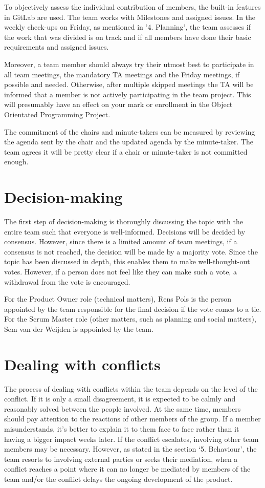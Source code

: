 \documentclass[sigconf,nonacm]{acmart}
\begin{document}
To objectively assess the individual contribution of members, the built-in features in GitLab are used. The team works with Milestones and assigned issues. In the weekly check-ups on Friday, as mentioned in '4. Planning', the team assesses if the work that was divided is on track and if all members have done their basic requirements and assigned issues.

Moreover, a team member should always try their utmost best to participate in all team meetings, the mandatory TA meetings and the Friday meetings, if possible and needed. Otherwise, after multiple skipped meetings the TA will be informed that a member is not actively participating in the team project. This will presumably have an effect on your mark or enrollment in the Object Orientated Programming Project.

The commitment of the chairs and minute-takers can be measured by reviewing the agenda sent by the chair and the updated agenda by the minute-taker. The team agrees it will be pretty clear if a chair or minute-taker is not committed enough. 


\section{Decision-making}
The first step of decision-making is thoroughly discussing the topic with the entire team such that everyone is well-informed. Decisions will be decided by consensus. However, since there is a limited amount of team meetings, if a consensus is not reached, the decision will be made by a majority vote. Since the topic has been discussed in depth, this enables them to make well-thought-out votes. However, if a person does not feel like they can make such a vote, a withdrawal from the vote is encouraged.

For the Product Owner role (technical matters), Rens Pols is the person appointed by the team responsible for the final decision if the vote comes to a tie.
For the Scrum Master role (other matters, such as planning and social matters), Sem van der Weijden is appointed by the team.


\section{Dealing with conflicts}
The process of dealing with conflicts within the team depends on the level of the conflict. If it is only a small disagreement, it is expected to be calmly and reasonably solved between the people involved. At the same time, members should pay attention to the reactions of other members of the group. If a member misunderstands, it's better to explain it to them face to face rather than it having a bigger impact weeks later. If the conflict escalates, involving other team members may be necessary. However, as stated in the section ‘5. Behaviour’, the team resorts to involving external parties or seeks their mediation, when a conflict reaches a point where it can no longer be mediated by members of the team and/or the conflict delays the ongoing development of the product.
\end{document}

